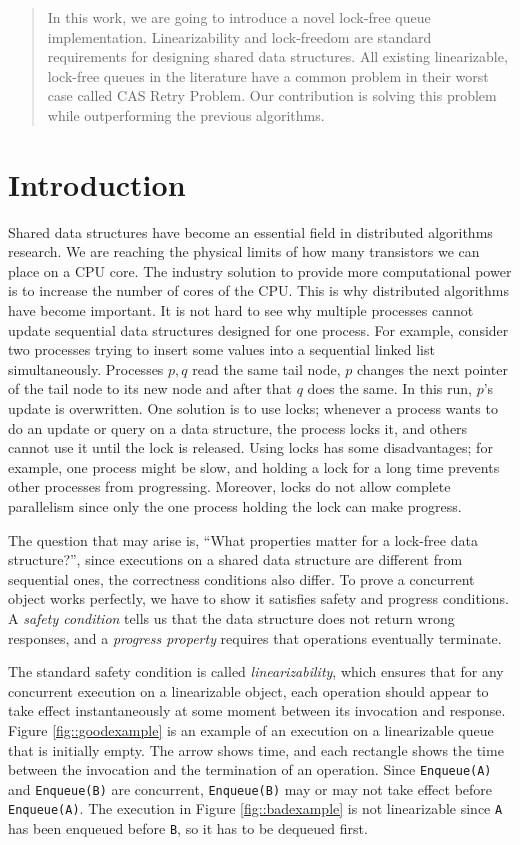 \documentclass[10pt]{article}
\theoremstyle{definition}
\begin{document}
\begin{abstract}
In this work, we are going to introduce a novel lock-free queue implementation.
Linearizability and lock-freedom are standard requirements for designing shared data structures. All existing linearizable, lock-free queues in the literature have a common problem in their worst case called CAS Retry Problem. Our contribution is solving this problem while outperforming the previous algorithms.
\end{abstract}

\section{Introduction}
Shared data structures have become an essential field in distributed algorithms research.
We are reaching the physical limits of how many transistors we can place on a CPU core. The industry solution to provide more computational power is to increase the number of cores of the CPU. This is why distributed algorithms have become important. It is not hard to see why multiple processes cannot update sequential data structures designed for one process. For example, consider two processes trying to insert some values into a sequential linked list simultaneously. Processes $p,q$ read the same tail node, $p$ changes the next pointer of the tail node to its new node and after that $q$ does the same. In this run, $p$'s update is overwritten. One solution is to use locks; whenever a process wants to do an update or query on a data structure, the process locks it, and others cannot use it until the lock is released. Using locks has some disadvantages; for example, one process might be slow, and holding a lock for a long time prevents other processes from progressing. Moreover, locks do not allow complete parallelism since only the one process holding the lock can make progress. 


The question that may arise is, ``What properties matter for a lock-free data structure?'', since executions on a shared data structure are different from sequential ones, the correctness conditions also differ. To prove a concurrent object works perfectly, we have to show it satisfies safety and progress conditions. A \textit{safety condition} tells us that the data structure does not return wrong responses, and a \textit{progress property} requires that operations eventually terminate.


The standard safety condition is called \textit{linearizability}, which ensures that for any concurrent execution on a linearizable object, each operation should appear to take effect instantaneously at some moment between its invocation and response. Figure \ref{fig::goodexample} is an example of an execution on a linearizable  queue that is initially empty. The arrow shows time, and each rectangle shows the time between the invocation and the termination of an operation. Since \texttt{Enqueue(A)} and \texttt{Enqueue(B)} are concurrent, \texttt{Enqueue(B)} may or may not take effect before \texttt{Enqueue(A)}. The execution in Figure \ref{fig::badexample} is not linearizable since \texttt{A} has been enqueued before \texttt{B}, so it has to be dequeued first.
\end{document}
